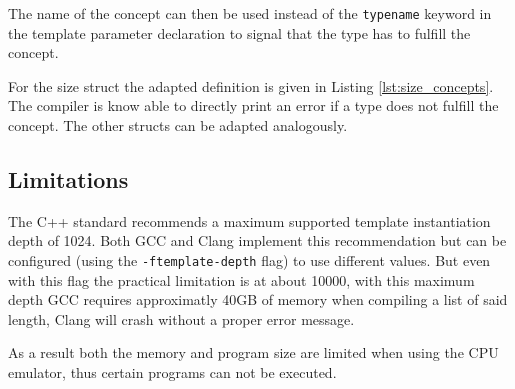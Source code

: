 

The name of the concept can then be used instead of the \lstinline{typename} keyword 
in the template parameter declaration to  signal that the type has to fulfill the concept. 

For the size struct the adapted definition is given in Listing \ref{lst:size_concepts}. The compiler is know able to directly print an error if a type does not fulfill the concept.
The other structs can be adapted analogously.


\subsection{Limitations} \label{sec:limitations}
The C++ standard recommends a maximum supported template instantiation depth of 1024.
Both GCC and Clang implement this recommendation but can be configured 
(using the \texttt{-ftemplate-depth} flag) to use different values. But even with
this flag the practical limitation is at about 10000, with this maximum depth
GCC requires approximatly 40GB of memory when compiling a list of said length, Clang will
crash without a proper error message.

As a result both the memory and program size are limited when using the CPU emulator,
thus certain programs can not be executed.
